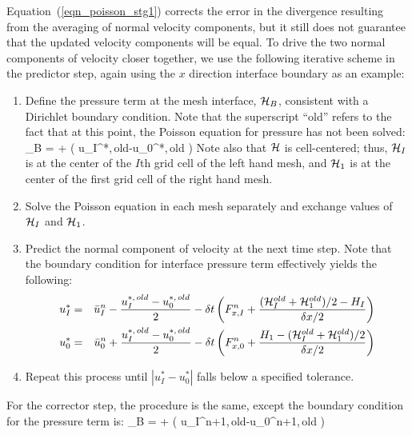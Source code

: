 Equation~(\ref{eqn_poisson_stg1}) corrects the error in the divergence resulting from the averaging of normal velocity components, but it still does not guarantee that the
updated velocity components will be equal. To drive the two normal components of velocity closer together, we use the
following iterative scheme in the predictor step, again using the $x$ direction interface boundary as an example:
\begin{enumerate}
\item Define the pressure term at the mesh interface, ${\cal H}_B$, consistent with a Dirichlet boundary condition. Note that the superscript ``old'' refers to the fact that at this point, the Poisson equation for pressure has not been solved:
\be
   \cH_B =  +  \left( u_I^{*,\,old}-u_0^{*,\,old} \right)
\ee
Note also that ${\cal H}$ is cell-centered; thus, ${\cal H}_I$ is at the center of the $I$th grid cell of the left hand mesh, and ${\cal H}_1$ is at the center of the first grid cell of the right hand mesh.
\item Solve the Poisson equation in each mesh separately and exchange values of ${\cal H}_I$ and ${\cal H}_1$.
\item Predict the normal component of velocity at the next time step. Note that the boundary condition for interface pressure term effectively yields the following:
\begin{eqnarray}
   u_I^* &=& \bar{u}_I^n - \frac{u_I^{*,\, old}-u_0^{*,\, old}}{2} - \delta t \left( F_{x,I}^{n} + \frac{ ({\cal H}_I^{old}+{\cal H}_1^{old})/2 - H_I }{ \delta x/2} \right) \label{uI} \\
   u_0^* &=& \bar{u}_0^n + \frac{u_I^{*,\, old}-u_0^{*,\, old}}{2} - \delta t \left( F_{x,0}^{n} + \frac{ H_1 - ({\cal H}_I^{old}+{\cal H}_1^{old})/2 }{ \delta x/2} \right) \label{u0}
\end{eqnarray}
\item Repeat this process until $\left| u_I^* - u_0^* \right|$ falls below a specified tolerance.
\end{enumerate}
For the corrector step, the procedure is the same, except the boundary condition for the pressure term is:
\be
   \cH_B =  +  \left( u_I^{n+1,\,old}-u_0^{n+1,\,old} \right)
\ee

